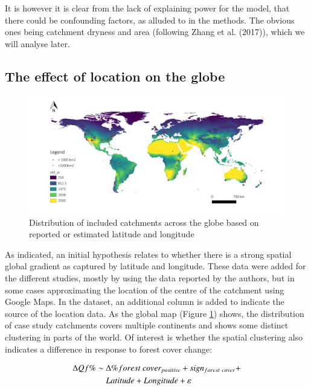 \documentclass[]{elsarticle} %
\begin{document}
It is however it is clear from the lack of explaining power for the model, that there could be confounding factors, as alluded to in the methods. The obvious ones being catchment dryness and area (following Zhang et al. (2017)), which we will analyse later.

\hypertarget{the-effect-of-location-on-the-globe}{%
\subsection{The effect of location on the globe}\label{the-effect-of-location-on-the-globe}}

\begin{figure}
\includegraphics[width=0.9\linewidth]{../../data/FAOET0data} \caption{Distribution of included catchments across the globe based on reported or estimated latitude and longitude}\label{fig:globalmap}
\end{figure}

As indicated, an initial hypothesis relates to whether there is a strong spatial global gradient as captured by latitude and longitude. These data were added for the different studies, mostly by using the data reported by the authors, but in some cases approximating the location of the centre of the catchment using Google Maps. In the dataset, an additional column is added to indicate the source of the location data. As the global map (Figure \ref{fig:globalmap}) shows, the distribution of case study catchments covers multiple continents and shows some distinct clustering in parts of the world. Of interest is whether the spatial clustering also indicates a difference in response to forest cover change:

\begin{align}
\Delta Qf \% \sim ~ & \Delta \% forest~cover_{positive} + sign_{forest~cover} + \notag \\ &  Latitude + Longitude + \varepsilon \label{eq:eq4}
\end{align}
\end{document}
